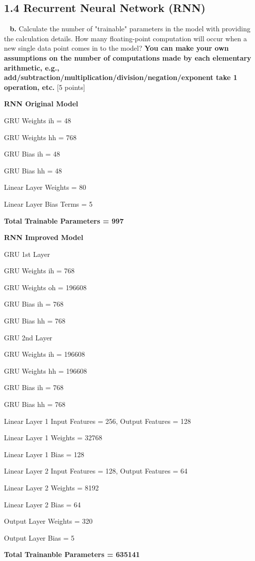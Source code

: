 \documentclass[12pt]{article}
\begin{document}
{{{{{{{{{{{{{{{{\subsection*{1.4 Recurrent Neural Network (RNN)}
~
\textbf{b.} Calculate the number of "trainable" parameters in the model with providing the calculation details. How many floating-point computation will occur when a new single data point comes in to the model?  \textbf{You can make your own assumptions on the number of computations made by each elementary arithmetic, e.g., add/subtraction/multiplication/division/negation/exponent take 1 operation, etc.} [5 points]

\bigskip

\textbf{RNN Original Model}

GRU Weights ih = 48

GRU Weights hh = 768

GRU Bias ih = 48

GRU Bias hh = 48

Linear Layer Weights = 80

Linear Layer Bias Terms = 5

\textbf{Total Trainable Parameters = 997}

\bigskip

\textbf{RNN Improved Model}

GRU 1st Layer

GRU Weights ih = 768

GRU Weights oh = 196608 

GRU Bias ih = 768

GRU Bias hh = 768

GRU 2nd Layer

GRU Weights ih = 196608

GRU Weights hh = 196608

GRU Bias ih = 768

GRU Bias hh = 768

Linear Layer 1 Input Features = 256, Output Features = 128

Linear Layer 1 Weights = 32768

Linear Layer 1 Bias = 128

Linear Layer 2 Input Features = 128, Output Features = 64

Linear Layer 2 Weights = 8192

Linear Layer 2 Bias = 64

Output Layer Weights = 320

Output Layer Bias =  5

\textbf{Total Trainanble Parameters = 635141}

}}}}}}}}}}}}}}}}
\end{document}
